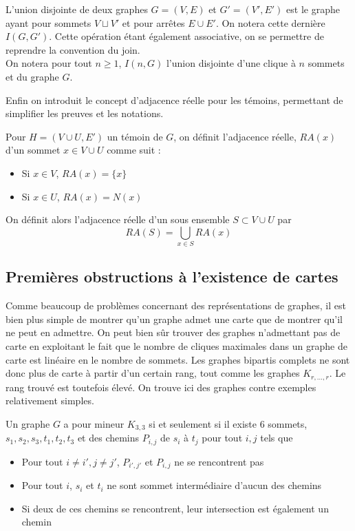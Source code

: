 \documentclass{scrartcl}
\begin{document}
\begin{flushleft}
\begin{def*}
    L'union disjointe de deux graphes $G = (V, E)$ et $G' = (V', E')$ est le graphe ayant pour sommets $V \sqcup V'$ et pour arrêtes
    $E \cup E'$. On notera cette dernière $I(G, G')$. Cette opération étant également associative, on se permettre de reprendre la
    convention du join.\\
    On notera pour tout $n \geq 1$, $I(n, G)$ l'union disjointe d'une clique à $n$ sommets et du graphe $G$.
\end{def*}

Enfin on introduit le concept d'adjacence réelle pour les témoins, permettant de simplifier les preuves et les notations.

\begin{def*}
    Pour $H = (V \cup U, E')$ un témoin de $G$, on définit l'adjacence réelle, $RA(x)$ d'un sommet $x \in V \cup U$ comme suit :
    \begin{itemize}
        \item Si $x \in V$, $RA(x) = \{x\}$
        \item Si $x \in U$, $RA(x) = N(x)$
    \end{itemize}
    On définit alors l'adjacence réelle d'un sous ensemble $S \subset V \cup U$ par
    \[ RA(S) = \bigcup_{x \in S} RA(x) \]
\end{def*}

\subsection{Premières obstructions à l'existence de cartes}

Comme beaucoup de problèmes concernant des représentations de graphes, il est bien plus simple de montrer qu'un graphe admet une
carte que de montrer qu'il ne peut en admettre. On peut bien sûr trouver des graphes n'admettant pas de carte en exploitant
le fait que le nombre de cliques maximales dans un graphe de carte est linéaire en le nombre de sommets. Les graphes bipartis
complets ne sont donc plus de carte à partir d'un certain rang, tout comme les graphes $K_{r,...,r}$. Le rang trouvé est toutefois
élevé. On trouve ici des graphes contre exemples relativement simples.

\begin{lem}\label{CNSK33}
    Un graphe $G$ a pour mineur $K_{3,3}$ si et seulement si il existe $6$ sommets, $s_1, s_2, s_3, t_1, t_2, t_3$ et des chemins
    $P_{i,j}$ de $s_i$ à $t_j$ pour tout $i, j$ tels que
    \begin{itemize}
        \item Pour tout $i \neq i', j \neq j'$, $P_{i',j'}$ et $P_{i, j}$ ne se rencontrent pas
        \item Pour tout $i$, $s_i$ et $t_i$ ne sont sommet intermédiaire d'aucun des chemins
        \item Si deux de ces chemins se rencontrent, leur intersection est également un chemin
    \end{itemize}
\end{lem}


\end{flushleft}
\end{document}

